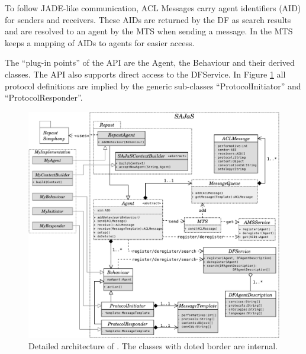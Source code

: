 To follow JADE-like communication, ACL Messages carry agent identifiers (AID) for senders and receivers. These AIDs are returned by the DF as search results and are resolved to an agent by the MTS when sending a message. In \apiname{} the MTS keeps a mapping of AIDs to agents for easier access.

The ``plug-in points'' of the API are the Agent, the Behaviour and their derived classes. The API also supports direct access to the DFService. In Figure \ref{fig:arch} all protocol definitions are implied by the generic sub-classes ``ProtocolInitiator'' and ``ProtocolResponder''. 

\begin{figure}[h]
	\centering
	\includegraphics[width=\linewidth]{figures/repacl_arch.pdf}
	\caption{Detailed architecture of \apiname{}. The classes with doted border are internal.}
	\label{fig:arch}
\end{figure}